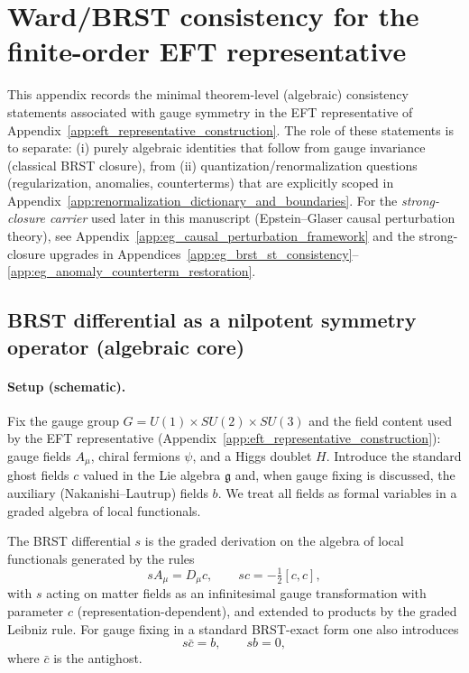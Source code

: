 \section{Ward/BRST consistency for the finite-order EFT representative}
\label{app:ward_brst_consistency}

This appendix records the minimal theorem-level (algebraic) consistency statements associated with gauge symmetry in the EFT representative of Appendix~\ref{app:eft_representative_construction}.
The role of these statements is to separate:
(i) purely algebraic identities that follow from gauge invariance (classical BRST closure),
from (ii) quantization/renormalization questions (regularization, anomalies, counterterms) that are explicitly scoped in Appendix~\ref{app:renormalization_dictionary_and_boundaries}.
For the \emph{strong-closure carrier} used later in this manuscript (Epstein--Glaser causal perturbation theory), see Appendix~\ref{app:eg_causal_perturbation_framework} and the strong-closure upgrades in Appendices~\ref{app:eg_brst_st_consistency}--\ref{app:eg_anomaly_counterterm_restoration}.

\subsection{BRST differential as a nilpotent symmetry operator (algebraic core)}

\paragraph{Setup (schematic).}
Fix the gauge group $G=U(1)\times SU(2)\times SU(3)$ and the field content used by the EFT representative (Appendix~\ref{app:eft_representative_construction}):
gauge fields $A_\mu$, chiral fermions $\psi$, and a Higgs doublet $H$.
Introduce the standard ghost fields $c$ valued in the Lie algebra $\mathfrak{g}$ and, when gauge fixing is discussed, the auxiliary (Nakanishi--Lautrup) fields $b$.
We treat all fields as formal variables in a graded algebra of local functionals.

\begin{definition}\label{def:z128_brst_differential}
\MathTag The BRST differential $s$ is the graded derivation on the algebra of local functionals generated by the rules
\[
sA_\mu = D_\mu c,\qquad sc = -\tfrac12[c,c],
\]
with $s$ acting on matter fields as an infinitesimal gauge transformation with parameter $c$ (representation-dependent),
and extended to products by the graded Leibniz rule.
For gauge fixing in a standard BRST-exact form one also introduces
\[
s\bar c = b,\qquad sb = 0,
\]
where $\bar c$ is the antighost.
\end{definition}

